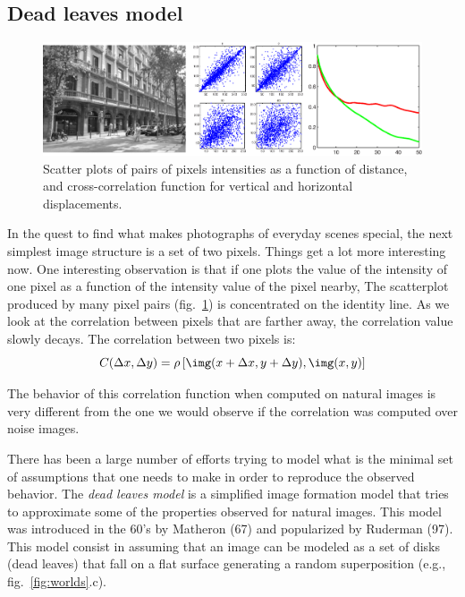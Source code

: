 \subsection{Dead leaves model}

\begin{figure}[htpb]
\centerline{
\includegraphics[width=1\linewidth]{figures/statistical_image_models/correlation.eps}
} 
\caption{Scatter plots of pairs of pixels intensities as a function of distance, and cross-correlation function for vertical and horizontal displacements.} 
\label{fig:correlation}
\end{figure}

In the quest to find what makes photographs of everyday scenes special, the next simplest image structure is a set of two pixels. Things get a lot more interesting now. One interesting observation is that if one plots the value of the intensity of one pixel as a function of the intensity value of the pixel nearby, The scatterplot produced by many pixel pairs (fig.~\ref{fig:correlation}) is concentrated on the identity line. As we look at the correlation between pixels that are farther away, the correlation value slowly decays. The correlation between two pixels is:
\begin{equation}
C(\Delta x, \Delta y) = \rho \left[ \img(x+\Delta x,y+ \Delta y), \img(x, y) \right]
\end{equation}

The behavior of this correlation function when computed on natural images is very different from the one we would observe if the correlation was computed over noise images. 

There has been a large number of efforts trying to model what is the minimal set of assumptions that one needs to make in order to reproduce the observed behavior. The {\em dead leaves model } is a simplified image formation model that tries to approximate some of the properties observed for natural images. This model was introduced in the 60's by Matheron (67) and popularized by Ruderman (97). This model consist in assuming that an image can be modeled as a set of disks (dead leaves) that fall on a flat surface generating a random superposition (e.g., fig.~\ref{fig:worlds}.c). 

